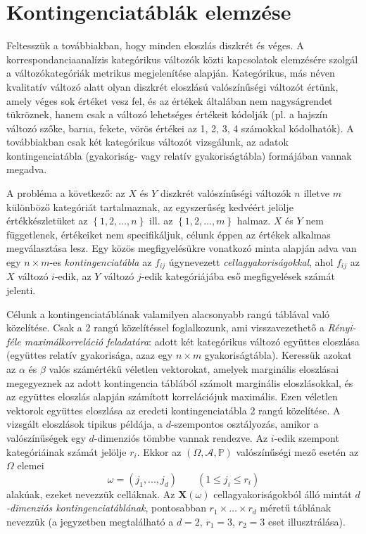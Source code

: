 \documentclass[DIV=15,appendixprefix]{scrreprt}
\theoremstyle{definition}
\theoremstyle{remark}
\begin{document}
\section{Kontingenciatáblák elemzése}
%
Feltesszük a továbbiakban, hogy minden eloszlás diszkrét és véges. A korrespondanciaanalízis
kategórikus változók közti kapcsolatok elemzésére szolgál a változókategóriák metrikus megjelenítése
alapján. Kategórikus, más néven kvalitatív változó alatt olyan diszkrét eloszlású valószínűségi
változót értünk, amely véges sok értéket vesz fel, és az értékek általában nem nagyságrendet
tükröznek, hanem csak a változó lehetséges értékeit kódolják (pl. a hajszín változó szőke, barna,
fekete, vörös értékei az 1, 2, 3, 4 számokkal kódolhatók). A továbbiakban csak két kategórikus
változót vizsgálunk, az adatok kontingenciatábla (gyakoriság- vagy relatív gyakoriságtábla)
formájában vannak megadva.

A probléma a következő: az $X$ és $Y$ diszkrét valószínűségi változók $n$ illetve $m$ különböző
kategóriát tartalmaznak, az egyszerűség kedvéért jelölje értékkészletüket az $ \left\{1,{} 2,{}
\ldots,{} n \right\} $ ill. az $ \left\{1,{} 2,{} \ldots,{} m \right\} $ halmaz. $X$ és $Y$ nem
függetlenek, értékeiket nem specifikáljuk, célunk éppen az értékek alkalmas megválasztása lesz. Egy
közös megfigyelésükre vonatkozó minta alapján adva van egy $n \times m$-es \emph{kontingenciatábla}
az $f_{ij}$ úgynevezett \emph{cellagyakoriságokkal}, ahol $f_{ij}$ az $X$ változó $i$-edik, az $Y$
változó $j$-edik kategóriájába eső megfigyelések számát jelenti.

Célunk a kontingenciatáblának valamilyen alacsonyabb rangú táblával való közelítése. Csak a 2 rangú
közelítéssel foglalkozunk, ami visszavezethető a \emph{Rényi-féle maximálkorreláció feladatára}:
adott két kategórikus változó együttes eloszlása (együttes relatív gyakorisága, azaz egy $n \times
m$ gyakoriságtábla). Keressük azokat az $\alpha$ és $\beta$ valós számértékű véletlen vektorokat,
amelyek marginális eloszlásai megegyeznek az adott kontingencia táblából számolt marginális
eloszlásokkal, és az együttes eloszlás alapján számított korrelációjuk maximális. Ezen véletlen
vektorok együttes eloszlása az eredeti kontingenciatábla 2 rangú közelítése.
%
A vizsgált eloszlások tipikus példája, a $d$-szempontos osztályozás, amikor a valószínűségek egy
$d$-dimenziós tömbbe vannak rendezve. Az $i$-edik szempont kategóriáinak számát jelölje $r_i$. Ekkor
az $\left( \Omega,{}\mathcal{A},{}\mathbb{P}  \right)$ valószínűségi mező esetén az $\Omega$ elemei
\begin{equation*}
	\omega = \left(j_1,...,j_d\right) \qquad \left( 1 \le j_i \le r_i \right)
\end{equation*}
alakúak, ezeket nevezzük celláknak. Az $\mathbf{X}\left(\omega\right)$ cellagyakoriságokból álló
mintát \emph{$d$-dimenziós kontingenciatáblának}, pontosabban $r_1 \times \ldots \times r_d$ méretű
táblának nevezzük (a jegyzetben megtalálható a $d=2$, $r_1=3$, $r_2=3$ eset illusztrálása).
\end{document}
